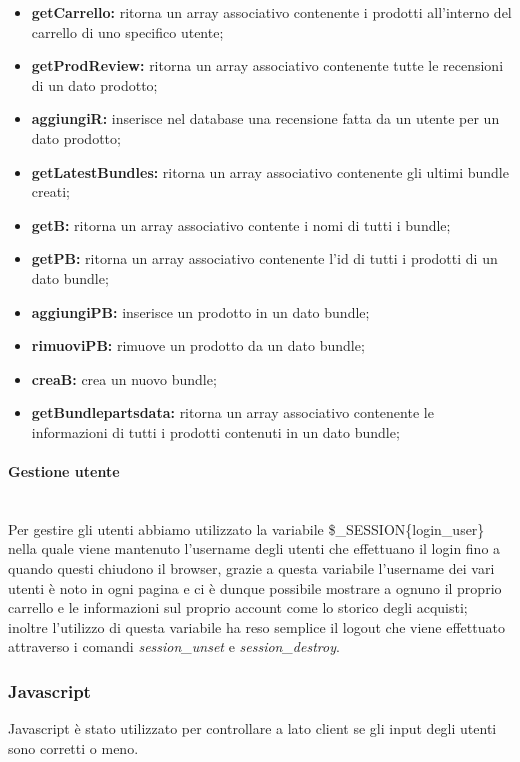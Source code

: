 \begin{itemize}
    \item \textbf{getCarrello:} ritorna un array associativo contenente i prodotti all'interno del carrello di uno specifico utente;
	\item \textbf{getProdReview:} ritorna un array associativo contenente tutte le recensioni di un dato prodotto;
	\item \textbf{aggiungiR:} inserisce nel database una recensione fatta da un utente per un dato prodotto;
	\item \textbf{getLatestBundles:} ritorna un array associativo contenente gli ultimi bundle creati; 
	\item \textbf{getB:} ritorna un array associativo contente i nomi di tutti i bundle;
	\item \textbf{getPB:} ritorna un array associativo contenente l'id di tutti i prodotti di un dato bundle;
	\item \textbf{aggiungiPB:} inserisce un prodotto in un dato bundle;
	\item \textbf{rimuoviPB:} rimuove un prodotto da un dato bundle;
	\item \textbf{creaB:} crea un nuovo bundle;
	\item \textbf{getBundlepartsdata:} ritorna un array associativo contenente le informazioni di tutti i prodotti contenuti in un dato bundle;
\end{itemize}

\paragraph{Gestione utente} \mbox{} \\
Per gestire gli utenti abbiamo utilizzato la variabile \$\_SESSION\{login\_user\} nella quale viene mantenuto l'username degli utenti che effettuano il login fino a quando questi chiudono il browser, grazie a questa variabile l'username dei vari utenti è noto in ogni pagina e ci è dunque possibile mostrare a ognuno il proprio carrello e le informazioni sul proprio account come lo storico degli acquisti;
inoltre l'utilizzo di questa variabile ha reso semplice il logout che viene effettuato attraverso i comandi \emph{session\_unset} e \emph{session\_destroy}.

\subsubsection{Javascript}
Javascript è stato utilizzato per controllare a lato client se gli input degli utenti sono corretti o meno.

